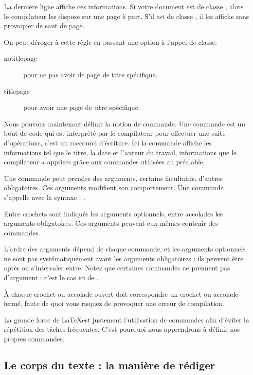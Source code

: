 La dernière ligne affiche ces informations. Si votre document est de classe  , alors le compilateur les dispose sur une page à part. S'il est de classe  , il les affiche sans provoquer de saut de page.

On peut déroger à cette règle en passant une option à l'appel de classe.
\begin{description}
\item[notitlepage] pour ne pas avoir de page de titre spécifique.
\item[titlepage] pour avoir une page de titre spécifique.
\end{description}

Nous pouvons maintenant définir la notion de commande. Une commande  est un bout de code qui est interprété par le compilateur pour effectuer une suite d'opérations, c'est un raccourci d'écriture. 
Ici la commande  affiche les informations tel que le titre, la date et l'auteur du travail, informations que le compilateur a apprises grâce aux commandes utilisées au préalable.

Une commande peut prendre des arguments, certains facultatifs, d'autres obligatoires. Ces arguments  modifient son comportement.
\label{syntaxecommande}Une commande s'appelle avec la syntaxe : 
.

Entre crochets sont indiqués les arguments optionnels, entre accolades les arguments obligatoires. Ces arguments peuvent eux-mêmes contenir des commandes.


L'ordre des arguments dépend de chaque commande, et les arguments optionnels ne sont pas systématiquement avant les arguments obligatoires : ils peuvent être après ou s'intercaler entre. Notez que certaines commandes ne prennent pas d'argument : c'est le cas ici de .

\begin{attention}
À chaque crochet ou accolade ouvert doit correspondre un crochet ou accolade fermé, faute de quoi vous risquez de provoquer une erreur de compilation.
\end{attention}

La grande force de \LaTeX est justement l'utilisation de commandes afin d'éviter la répétition des tâches fréquentes. C'est pourquoi nous apprendrons à définir nos propres commandes.



\subsection{Le corps du texte : la manière de rédiger}

